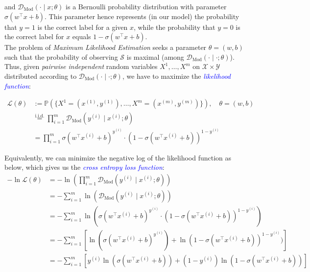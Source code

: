 and $\mathcal{D}_{\text{Mod}}(\cdot \mid x;\theta)$ is a Bernoulli probability distribution with parameter $\sigma(w^\top x + b)$. This parameter hence represents (in our model) the probability that $y=1$ is the correct label for a given $x$, while the probability that $y=0$ is the correct label for $x$ equals $1 - \sigma(w^\top x + b)$.\\

The problem of \emph{Maximum Likelihood Estimation} seeks a parameter $\theta=(w,b)$ such that the probability of observing $\mathcal{S}$ is maximal (among $\mathcal{D}_{\text{Mod}}(\cdot \mid \cdot;\theta)$). Thus, given \emph{pairwise independent} random variables $X^1, \dots, X^m$ on $\mathcal{X} \times \mathcal{Y}$ distributed according to $\mathcal{D}_{\text{Mod}}(\cdot \mid \cdot;\theta)$, we have to maximize the \textcolor{blue}{\emph{likelihood function}}:

\begin{equation}
    \begin{aligned}
    \mathcal{L}(\theta) &:= \mathbb{P}(\{X^1 = (x^{(1)}, y^{(1)}), \dots, X^m = (x^{(m)}, y^{(m)})\}), \quad \theta=(w,b)\\
    & \overset{\text{i.i.d.}}{=} \prod_{i=1}^{m}\mathcal{D}_{\text{Mod}}(y^{(i)}\mid x^{(i)};\theta)\\
    & = \prod_{i=1}^{m}\sigma(w^\top x^{(i)} + b)^{y^{(i)}} \cdot (1 - \sigma(w^\top x^{(i)} + b))^{1 - y^{(i)}}
    \end{aligned}
    \label{eqn:4}
\end{equation}

Equivalently, we can minimize the negative log of the likelihood function as below, which gives us the \textcolor{blue}{\emph{cross entropy loss function}}:
\begin{equation}
    \begin{aligned}
    -\ln \mathcal{L}(\theta) &= -\ln(\prod_{i=1}^{m}\mathcal{D}_{\text{Mod}}(y^{(i)} \mid x^{(i)};\theta))\\
    &= -\sum_{i=1}^{m}\ln(\mathcal{D}_{\text{Mod}}(y^{(i)}\mid x^{(i)};\theta))\\
    &= -\sum_{i=1}^{m}\ln(\sigma(w^\top x^{(i)} + b)^{y^{(i)}} \cdot (1 - \sigma(w^\top x^{(i)} + b))^{1 - y^{(i)}})\\
    &= -\sum_{i=1}^{m}[\ln(\sigma(w^\top x^{(i)} + b)^{y^{(i)}})+ \ln(1 - \sigma(w^\top x^{(i)} + b))^{1 - y^{(i)}})]\\
    &= -\sum_{i=1}^{m}[y^{(i)}\ln(\sigma(w^\top x^{(i)} + b))+(1-y^{(i)})\ln(1 - \sigma(w^\top x^{(i)} + b))]
    \end{aligned}
    \label{eqn:5}
\end{equation}


